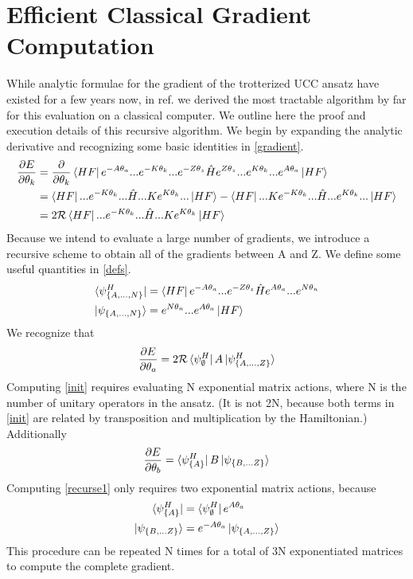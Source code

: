 \documentclass{article}
\begin{document}
\section{Efficient Classical Gradient Computation}\label{gradientalgorithm}
\begin{paragraph}{}
While analytic formulae for the gradient of the trotterized UCC ansatz have existed for a few years now, in ref.  we derived the most tractable algorithm by far for this evaluation on a classical computer. \cite{crooks, grimsley, romero, guerreschi}  We outline here the proof and execution details of this recursive algorithm. We begin by expanding the analytic derivative and recognizing some basic identities in \ref{gradient}.
\begin{align}\label{gradient}
\frac{\partial E}{\partial \theta_k}&=\frac{\partial}{\partial\theta_k}\bra{HF}e^{-A\theta_a}...e^{-K\theta_k}...e^{-Z\theta_z}\hat{H}e^{Z\theta_z}...e^{K\theta_k}...e^{A\theta_a}\ket{HF}\\
&=\bra{HF}...e^{-K\theta_k}...\hat{H}...Ke^{K\theta_k}...\ket{HF}-\bra{HF}...Ke^{-K\theta_k}...\hat{H}...e^{K\theta_k}...\ket{HF}\nonumber\\
\nonumber&=2\mathcal{R}\bra{HF}...e^{-K\theta_k}...\hat{H}...Ke^{K\theta_k}\ket{HF}
\end{align}
Because we intend to evaluate a large number of gradients, we introduce a recursive scheme to obtain all of the gradients between A and Z.  We define some useful quantities in \ref{defs}.
\begin{align}\label{defs}
\bra{\psi^H_{\{A,...,N\}}}&=\bra{HF}e^{-A\theta_a}...e^{-Z\theta_z}\hat{H}e^{A\theta_a}...e^{N\theta_n}\\\nonumber \ket{\psi_{\{A,...,N\}}}&=e^{N\theta_n}...e^{A\theta_a}\ket{HF}
\end{align}
We recognize that
\begin{equation}\label{init}
\frac{\partial E}{\partial \theta_a}=  2\mathcal{R}\bra{\psi^H_\emptyset}A\ket{\psi^H_{\{A,...,Z\}}}
\end{equation}
Computing \ref{init} requires evaluating N exponential matrix actions, where N is the number of unitary operators in the ansatz.  (It is not 2N, because both terms in \ref{init} are related by transposition and multiplication by the Hamiltonian.)  Additionally
\begin{equation}\label{recurse1}
\frac{\partial E}{\partial \theta_b}=\bra{\psi^H_{\{A\}}}B\ket{\psi_{\{B,...Z\}}}
\end{equation}
Computing \ref{recurse1} only requires two exponential matrix actions, because
\begin{align}\label{recurse2}
\bra{\psi^H_{\{A\}}} & = \bra{\psi^H_\emptyset} e^{A\theta_a}\\
\ket{\psi_{\{B,...Z\}}} & = e^{-A\theta_a}\ket{\psi_{\{A,...,Z\}}}
\end{align}  
This procedure can be repeated N times for a total of 3N exponentiated matrices to compute the complete gradient.
\end{paragraph}

\end{document}
